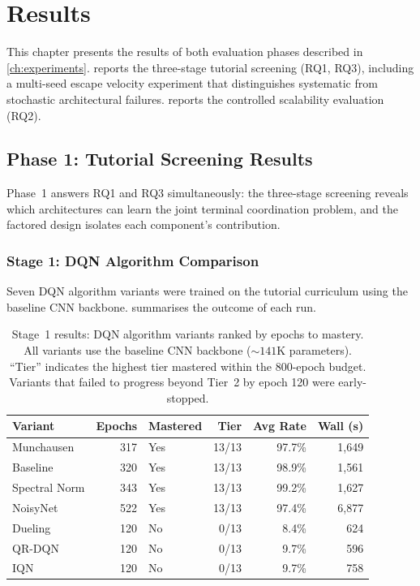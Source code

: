\chapter{Results}
\label{ch:results}

This chapter presents the results of both evaluation phases described in \cref{ch:experiments}.  reports the three-stage tutorial screening (RQ1, RQ3), including a multi-seed escape velocity experiment that distinguishes systematic from stochastic architectural failures.  reports the controlled scalability evaluation (RQ2).

\section{Phase 1: Tutorial Screening Results}
\label{sec:res:phase1}

Phase~1 answers RQ1 and RQ3 simultaneously: the three-stage screening reveals which architectures can learn the joint terminal coordination problem, and the factored design isolates each component's contribution.

\subsection{Stage 1: DQN Algorithm Comparison}
\label{sec:res:phase1:dqn}

Seven DQN algorithm variants were trained on the tutorial curriculum using the baseline CNN backbone.  summarises the outcome of each run.

\begin{table}[H]
  \centering
  \caption{Stage~1 results: DQN algorithm variants ranked by epochs to mastery. All variants use the baseline CNN backbone (${\sim}141$K parameters). ``Tier'' indicates the highest tier mastered within the 800-epoch budget. Variants that failed to progress beyond Tier~2 by epoch 120 were early-stopped.}
  \label{tab:res:dqn_summary}
  \begin{tabular}{@{} l r l r r r @{}}
    \toprule
    \textbf{Variant} & \textbf{Epochs} & \textbf{Mastered} & \textbf{Tier} & \textbf{Avg Rate} & \textbf{Wall (s)} \\
    \midrule
    Munchausen     & 317 & Yes & 13/13 & 97.7\% & 1{,}649 \\
    Baseline       & 320 & Yes & 13/13 & 98.9\% & 1{,}561 \\
    Spectral Norm  & 343 & Yes & 13/13 & 99.2\% & 1{,}627 \\
    NoisyNet       & 522 & Yes & 13/13 & 97.4\% & 6{,}877 \\
    \midrule
    Dueling        & 120 & No  & 0/13  & 8.4\%  & 624 \\
    QR-DQN         & 120 & No  & 0/13  & 9.7\%  & 596 \\
    IQN            & 120 & No  & 0/13  & 9.7\%  & 758 \\
    \bottomrule
  \end{tabular}
\end{table}

